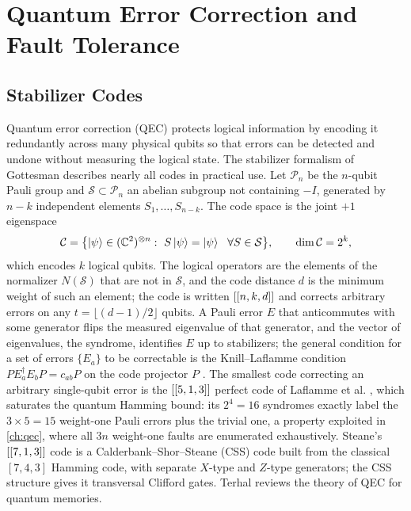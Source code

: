 \section{Quantum Error Correction and Fault Tolerance}\label{sec:bg:qec}

\subsection{Stabilizer Codes}

Quantum error correction (QEC) protects logical information by encoding it redundantly across many physical qubits so that errors can be detected and undone without measuring the logical state. The stabilizer formalism of Gottesman \cite{gottesman1997stabilizer} describes nearly all codes in practical use. Let $\mathcal{P}_n$ be the $n$-qubit Pauli group and $\mathcal{S}\subset\mathcal{P}_n$ an abelian subgroup not containing $-I$, generated by $n-k$ independent elements $S_1,\dots,S_{n-k}$. The code space is the joint $+1$ eigenspace
\begin{equation}\label{eq:bg:stabilizer}
\mathcal{C}=\bigl\{\ket{\psi}\in(\C^2)^{\otimes n}:\ S\ket{\psi}=\ket{\psi}\ \ \forall S\in\mathcal{S}\bigr\},\qquad \dim\mathcal{C}=2^{k},
\end{equation}
which encodes $k$ logical qubits. The logical operators are the elements of the normalizer $N(\mathcal{S})$ that are not in $\mathcal{S}$, and the code distance $d$ is the minimum weight of such an element; the code is written $[[n,k,d]]$ and corrects arbitrary errors on any $t=\lfloor(d-1)/2\rfloor$ qubits. A Pauli error $E$ that anticommutes with some generator flips the measured eigenvalue of that generator, and the vector of eigenvalues, the syndrome, identifies $E$ up to stabilizers; the general condition for a set of errors $\{E_a\}$ to be correctable is the Knill--Laflamme condition $PE_a^{\dagger}E_bP=c_{ab}P$ on the code projector $P$ \cite{knill1997theory}. The smallest code correcting an arbitrary single-qubit error is the $[[5,1,3]]$ perfect code of Laflamme et al. \cite{laflamme1996perfect}, which saturates the quantum Hamming bound: its $2^4=16$ syndromes exactly label the $3\times5=15$ weight-one Pauli errors plus the trivial one, a property exploited in \cref{ch:qec}, where all $3n$ weight-one faults are enumerated exhaustively. Steane's $[[7,1,3]]$ code \cite{steane1996codes} is a Calderbank--Shor--Steane (CSS) code \cite{calderbank1996goodcodes} built from the classical $[7,4,3]$ Hamming code, with separate $X$-type and $Z$-type generators; the CSS structure gives it transversal Clifford gates. Terhal \cite{terhal2015qecmemories} reviews the theory of QEC for quantum memories.

